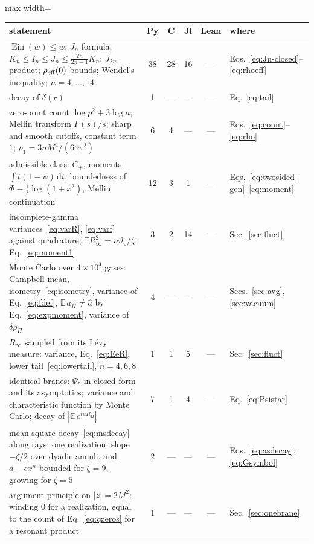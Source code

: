 \documentclass[a4paper,11pt]{article}
\newcommand{\bE}{\mathbb{E}}
\newcommand{\dd}{\mathrm{d}}
\newcommand{\Ein}{\operatorname{Ein}}
\begin{document}
\begin{table}[tp]
\centering
\setlength{\tabcolsep}{4pt}
\small\begin{adjustbox}{max width=\linewidth}\begin{tabular}{p{10.6cm}ccccl}
statement & Py & C & Jl & Lean & where\\
\hline
$\Ein(w)\le w$; $J_n$ formula; $K_n\le I_n\le J_n\le\frac{2n}{2n-1}K_n$; $J_{2m}$ product; $\rho_{\rm eff}(0)$ bounds; Wendel's inequality; $n=4,\dots,14$ & 38 & 28 & 16 & --- & Eqs.~\eqref{eq:Jn-closed}--\eqref{eq:rhoeff}\\
decay of $\delta(r)$ & 1 & --- & --- & --- & Eq.~\eqref{eq:tail}\\
zero-point count $\log p^2+3\log a$; Mellin transform $\Gamma(s)/s$; sharp and smooth cutoffs, constant term $1$; $\rho_1=3nM^4/(64\pi^2)$ & 6 & 4 & --- & --- & Eqs.~\eqref{eq:count}--\eqref{eq:rho}\\
admissible class: $C_+$, moments $\int t(1-\psi)\,\dd t$, boundedness of $\Phi-\frac12\log(1+x^2)$, Mellin continuation & 12 & 3 & 1 & --- & Eqs.~\eqref{eq:twosided-gen}--\eqref{eq:moment}\\
incomplete-gamma variances~\eqref{eq:varR}, \eqref{eq:varf} against quadrature; $\bE R_\infty^2=n\vartheta_0/\zeta$; Eq.~\eqref{eq:moment1} & 3 & 2 & 14 & --- & Sec.~\ref{sec:fluct}\\
Monte Carlo over $4\times10^4$ gases: Campbell mean, isometry~\eqref{eq:isometry}, variance of Eq.~\eqref{eq:fdef}, $\bE\,a_\Pi\ne\hat a$ by Eq.~\eqref{eq:expmoment}, variance of $\delta\rho_\Pi$ & 4 & --- & --- & --- & Secs.~\ref{sec:avg}, \ref{sec:vacuum}\\
$R_\infty$ sampled from its L\'evy measure: variance, Eq.~\eqref{eq:EeR}, lower tail~\eqref{eq:lowertail}, $n=4,6,8$ & 1 & 1 & 5 & --- & Sec.~\ref{sec:fluct}\\
identical branes: $\Psi_*$ in closed form and its asymptotics; variance and characteristic function by Monte Carlo; decay of $|\bE\,e^{iuR_\Pi}|$ & 7 & 1 & 4 & --- & Eq.~\eqref{eq:Psistar}\\
mean-square decay~\eqref{eq:msdecay} along rays; one realization: slope $-\zeta/2$ over dyadic annuli, and $a-cx^n$ bounded for $\zeta=9$, growing for $\zeta=5$ & 2 & --- & --- & --- & Eqs.~\eqref{eq:asdecay}, \eqref{eq:Gsymbol}\\
argument principle on $|z|=2M^2$: winding $0$ for a realization, equal to the count of Eq.~\eqref{eq:qzeros} for a resonant product & 1 & --- & --- & --- & Sec.~\ref{sec:onebrane}\\

\end{tabular}
\end{adjustbox}
\end{table}
\end{document}
